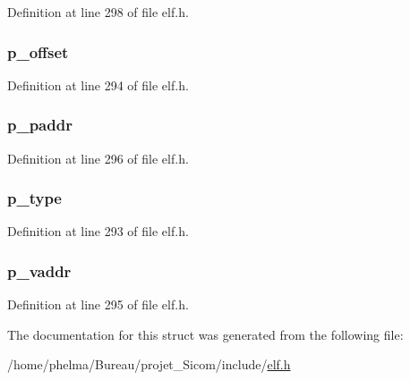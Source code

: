 Definition at line 298 of file elf.\-h.

\hypertarget{struct_elf32___phdr_a8506a191f6eb19d977badcc7b79304da}{
\subsubsection[{p\-\_\-offset}]{ p\-\_\-offset}}\label{struct_elf32___phdr_a8506a191f6eb19d977badcc7b79304da}


Definition at line 294 of file elf.\-h.

\hypertarget{struct_elf32___phdr_a0d8f4187ea1e170564f61f9de0a2e0b4}{
\subsubsection[{p\-\_\-paddr}]{ p\-\_\-paddr}}\label{struct_elf32___phdr_a0d8f4187ea1e170564f61f9de0a2e0b4}


Definition at line 296 of file elf.\-h.

\hypertarget{struct_elf32___phdr_a1b4ed5de6b34c773a4bd176b0b1a486b}{
\subsubsection[{p\-\_\-type}]{ p\-\_\-type}}\label{struct_elf32___phdr_a1b4ed5de6b34c773a4bd176b0b1a486b}


Definition at line 293 of file elf.\-h.

\hypertarget{struct_elf32___phdr_acabdf03daaa792ce4051b6883b0df40d}{
\subsubsection[{p\-\_\-vaddr}]{ p\-\_\-vaddr}}\label{struct_elf32___phdr_acabdf03daaa792ce4051b6883b0df40d}


Definition at line 295 of file elf.\-h.



The documentation for this struct was generated from the following file\-:\begin{DoxyCompactItemize}
\item 
/home/phelma/\-Bureau/projet\-\_\-\-Sicom/include/\hyperlink{elf_8h}{elf.\-h}\end{DoxyCompactItemize}
